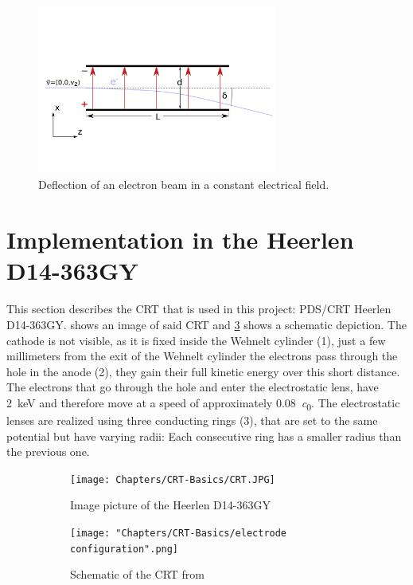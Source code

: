 \begin{figure}
	\centering
	\includegraphics[width=0.7\textwidth]{Chapters/CRT-Basics/DeflectionPlate2}
	\caption{Deflection of an electron beam in a constant electrical field.}
	\label{fig:deflectionplate2}
\end{figure}

\section{Implementation in the Heerlen D14-363GY }


This section describes the CRT that is used in this project: PDS/CRT Heerlen D14-363GY.  shows an image of said CRT and \cref{fig:SchemeCRT} shows a schematic depiction. The cathode is not visible, as it is fixed inside the Wehnelt cylinder (1), just a few millimeters from the exit of the Wehnelt cylinder the electrons pass through the hole in the anode (2), they gain their full kinetic energy over this short distance. The electrons that go through the hole and enter the electrostatic lens, have \SI{2}{\kilo\electronvolt} and therefore move at a speed of approximately \SI{0.08}{\clight}. 
The electrostatic lenses are realized using three conducting rings (3), that are set to the same potential but have varying radii: Each consecutive ring has a smaller radius than the previous one. 

\begin{figure}
	\centering
	\begin{subfigure}{.5\textwidth}
		\centering
		\texttt{[image: Chapters/CRT-Basics/CRT.JPG]}
		\caption{Image picture of the Heerlen D14-363GY}
		\label{fig:FotoCRT}
	\end{subfigure}%
	\begin{subfigure}{.5\textwidth}
		\centering
		\texttt{[image: "Chapters/CRT-Basics/electrode configuration".png]}
		\caption{Schematic of the CRT from \cite{D14363GY123-manual}}
		\label{fig:SchemeCRT}
	\end{subfigure}
	\caption{}
	\label{}
\end{figure}


